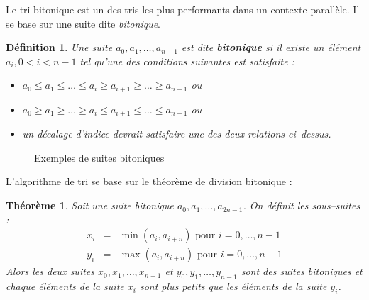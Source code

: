 \documentclass[11pt,a4paper]{article}
\newtheorem{definition}{Définition}
\newtheorem{theo}{Théorème}
\begin{document}
Le tri bitonique est un des tris les plus performants dans un contexte
parallèle. Il se base sur une suite dite \textsl{bitonique}.

\begin{definition}
Une suite $a_{0},a_{1},\ldots,a_{n-1}$
est dite \textbf{bitonique} si il existe un élément $a_{i},0<i<n-1$ tel qu'une
des conditions suivantes est satisfaite :
\begin{itemize}
\item $a_{0}\leq a_{1}\leq \ldots \leq a_{i} \geq a_{i+1} \geq \ldots \geq a_{n-1}$ ou
\item $a_{0}\geq a_{1}\geq \ldots \geq a_{i} \leq a_{i+1} \leq \ldots \leq a_{n-1}$ ou
\item un décalage d'indice devrait satisfaire une des deux relations ci--dessus.
\end{itemize}
\end{definition}

\begin{figure}[h]
\caption{Exemples de suites bitoniques}
\end{figure}

L'algorithme de tri se base sur le théorème de division bitonique :

\begin{theo}
Soit une suite bitonique $a_{0},a_{1},\ldots, a_{2n-1}$. On définit les
sous--suites :
\[
\begin{array}{lcl}
x_{i} & = & \min(a_{i},a_{i+n}) \mbox{ pour } i=0,\ldots,n-1\\
y_{i} & = & \max(a_{i},a_{i+n}) \mbox{ pour } i=0,\ldots,n-1
\end{array}
\]
Alors les deux suites $x_{0},x_{1},\ldots,x_{n-1}$ et $y_{0},y_{1},\ldots,y_{n-1}$
sont des suites bitoniques et chaque éléments de la suite $x_{i}$ sont plus petits que
les éléments de la suite $y_{i}$.
\end{theo}
\end{document}
